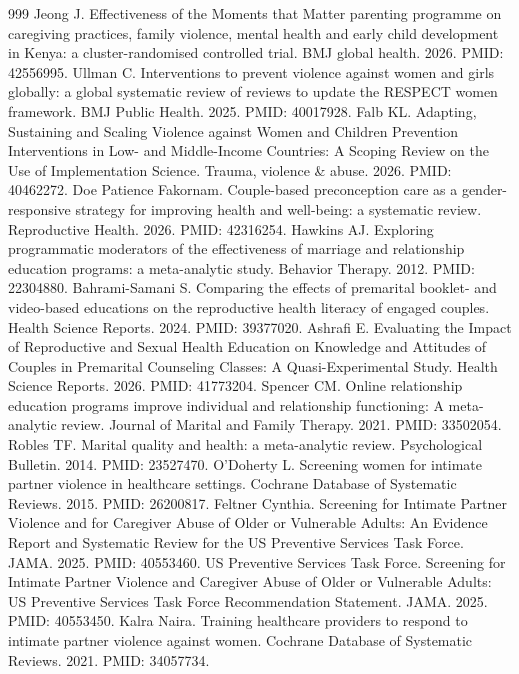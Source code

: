 \begin{thebibliography}{999}
 Jeong J. Effectiveness of the Moments that Matter parenting programme on caregiving practices, family violence, mental health and early child development in Kenya: a cluster-randomised controlled trial. BMJ global health. 2026. PMID: 42556995.
 Ullman C. Interventions to prevent violence against women and girls globally: a global systematic review of reviews to update the RESPECT women framework. BMJ Public Health. 2025. PMID: 40017928.
 Falb KL. Adapting, Sustaining and Scaling Violence against Women and Children Prevention Interventions in Low- and Middle-Income Countries: A Scoping Review on the Use of Implementation Science. Trauma, violence \& abuse. 2026. PMID: 40462272.
 Doe Patience Fakornam. Couple-based preconception care as a gender-responsive strategy for improving health and well-being: a systematic review. Reproductive Health. 2026. PMID: 42316254.
 Hawkins AJ. Exploring programmatic moderators of the effectiveness of marriage and relationship education programs: a meta-analytic study. Behavior Therapy. 2012. PMID: 22304880.
 Bahrami-Samani S. Comparing the effects of premarital booklet- and video-based educations on the reproductive health literacy of engaged couples. Health Science Reports. 2024. PMID: 39377020.
 Ashrafi E. Evaluating the Impact of Reproductive and Sexual Health Education on Knowledge and Attitudes of Couples in Premarital Counseling Classes: A Quasi-Experimental Study. Health Science Reports. 2026. PMID: 41773204.
 Spencer CM. Online relationship education programs improve individual and relationship functioning: A meta-analytic review. Journal of Marital and Family Therapy. 2021. PMID: 33502054.
 Robles TF. Marital quality and health: a meta-analytic review. Psychological Bulletin. 2014. PMID: 23527470.
 O'Doherty L. Screening women for intimate partner violence in healthcare settings. Cochrane Database of Systematic Reviews. 2015. PMID: 26200817.
 Feltner Cynthia. Screening for Intimate Partner Violence and for Caregiver Abuse of Older or Vulnerable Adults: An Evidence Report and Systematic Review for the US Preventive Services Task Force. JAMA. 2025. PMID: 40553460.
 US Preventive Services Task Force. Screening for Intimate Partner Violence and Caregiver Abuse of Older or Vulnerable Adults: US Preventive Services Task Force Recommendation Statement. JAMA. 2025. PMID: 40553450.
 Kalra Naira. Training healthcare providers to respond to intimate partner violence against women. Cochrane Database of Systematic Reviews. 2021. PMID: 34057734.

\end{thebibliography}

